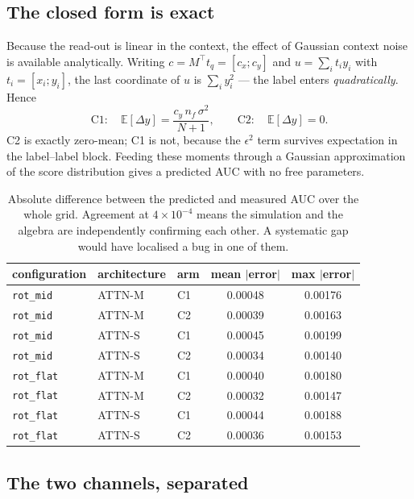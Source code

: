 \documentclass[11pt,a4paper]{article}
\newcommand{\vs}{\sigma^2}
\begin{document}
\clearpage
\subsection{The closed form is exact}

Because the read-out is linear in the context, the effect of Gaussian context
noise is available analytically. Writing $c = M^{\!\top}t_q = [c_x; c_y]$ and
$u=\sum_i t_i y_i$ with $t_i=[x_i;y_i]$, the last coordinate of $u$ is
$\sum_i y_i^2$ --- the label enters \emph{quadratically}. Hence
\[
\text{C1}:\quad \mathbb{E}[\Delta\hat y] = \frac{c_y\, n_f\, \vs}{N+1},
\qquad
\text{C2}:\quad \mathbb{E}[\Delta\hat y] = 0 .
\]
C2 is exactly zero-mean; C1 is not, because the $\epsilon^2$ term survives
expectation in the label--label block. Feeding these moments through a Gaussian
approximation of the score distribution gives a predicted AUC with no free
parameters.


\begin{table}[h]\centering\small
\begin{tabular}{lllcc}
\toprule
configuration & architecture & arm & mean $|$error$|$ & max $|$error$|$ \\
\midrule
\texttt{rot\_mid} & ATTN-M & C1 & 0.00048 & 0.00176 \\
\texttt{rot\_mid} & ATTN-M & C2 & 0.00039 & 0.00163 \\
\texttt{rot\_mid} & ATTN-S & C1 & 0.00045 & 0.00199 \\
\texttt{rot\_mid} & ATTN-S & C2 & 0.00034 & 0.00140 \\
\texttt{rot\_flat} & ATTN-M & C1 & 0.00040 & 0.00180 \\
\texttt{rot\_flat} & ATTN-M & C2 & 0.00032 & 0.00147 \\
\texttt{rot\_flat} & ATTN-S & C1 & 0.00044 & 0.00188 \\
\texttt{rot\_flat} & ATTN-S & C2 & 0.00036 & 0.00153 \\
\bottomrule
\end{tabular}
\caption{Absolute difference between the predicted and measured AUC over the
whole grid. Agreement at $4\times10^{-4}$ means the simulation and the algebra
are independently confirming each other. A systematic gap would have localised a
bug in one of them.}
\end{table}



\subsection{The two channels, separated}
\end{document}

